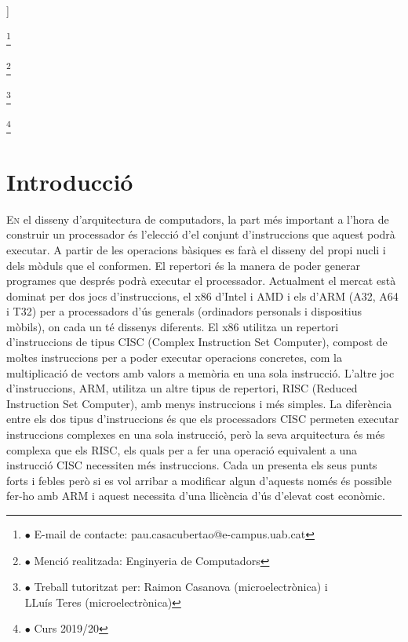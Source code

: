 \documentclass[10pt,a4paper,twocolumn,twoside]{article}
\newcommand\blfootnote[1]{%
  \begingroup
  \renewcommand\thefootnote{}\footnote{#1}%
  \addtocounter{footnote}{-1}%
  \endgroup
}
\begin{document}
\begin{@twocolumnfalse}
\begin{center}
\bigskip

{\vrule depth 0pt height 0.5pt width 4cm\hspace{7.5pt}%
%
\hspace{7.5pt}\vrule depth 0pt height 0.5pt width 4cm\relax}

\end{center}

\bigskip
\end{@twocolumnfalse}]


\blfootnote{$\bullet$ E-mail de contacte: pau.casacubertao@e-campus.uab.cat}
\blfootnote{$\bullet$ Menció realitzada: Enginyeria de Computadors }
\blfootnote{$\bullet$ Treball tutoritzat per: Raimon Casanova (microelectrònica) i\\ LLuís Teres (microelectrònica)}
\blfootnote{$\bullet$ Curs 2019/20}



\section{Introducció}
\lettrine[lines=3]{E}{n} el disseny d'arquitectura de computadors, la part més important a l'hora de construir un processador és l'elecció d'el conjunt d'instruccions que aquest podrà executar. A partir de les operacions bàsiques es farà el disseny del propi nucli i dels mòduls que el conformen. 
El repertori és la manera de poder generar programes que després podrà executar el processador. Actualment el mercat està dominat per dos jocs d'instruccions, el x86 d'Intel i AMD i els d'ARM (A32, A64 i T32) per a processadors d'ús generals (ordinadors personals i dispositius mòbils), on cada un té dissenys diferents. El x86 utilitza un repertori d'instruccions de tipus CISC (Complex Instruction Set Computer), compost de moltes instruccions per a poder executar operacions concretes, com la multiplicació de vectors amb valors a memòria en una sola instrucció. L'altre joc d'instruccions, ARM, utilitza un altre tipus de repertori, RISC (Reduced Instruction Set Computer), amb menys instruccions i més simples. La diferència entre els dos tipus d'instruccions és que els processadors CISC permeten executar instruccions complexes en una sola instrucció, però la seva arquitectura és més complexa que els RISC, els quals per a fer una operació equivalent a una instrucció CISC necessiten més instruccions. Cada un presenta els seus punts forts i febles però si es vol  arribar a modificar algun d'aquests només és possible fer-ho amb ARM i aquest necessita d'una llicència d'ús d'elevat cost econòmic.
\end{document}
